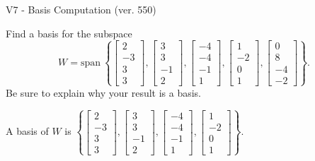 \begin{exercise}
  \begin{exerciseTitle}V7 - Basis Computation (ver. 550)\end{exerciseTitle}
  \begin{exerciseStatement}
    Find a basis for the subspace 
\[W=\mathrm{span}\ \left\{\left[\begin{array}{r}
2 \\
-3 \\
3 \\
3
\end{array}\right] , \left[\begin{array}{r}
3 \\
3 \\
-1 \\
2
\end{array}\right] , \left[\begin{array}{r}
-4 \\
-4 \\
-1 \\
1
\end{array}\right] , \left[\begin{array}{r}
1 \\
-2 \\
0 \\
1
\end{array}\right] , \left[\begin{array}{r}
0 \\
8 \\
-4 \\
-2
\end{array}\right]\right\}.\]
 Be sure to explain why your result is a basis.


  \end{exerciseStatement}
  \begin{exerciseAnswer}
   A basis of \(W\) is  \(\left\{\left[\begin{array}{r}
2 \\
-3 \\
3 \\
3
\end{array}\right] , \left[\begin{array}{r}
3 \\
3 \\
-1 \\
2
\end{array}\right] , \left[\begin{array}{r}
-4 \\
-4 \\
-1 \\
1
\end{array}\right] , \left[\begin{array}{r}
1 \\
-2 \\
0 \\
1
\end{array}\right]\right\}\).
  


  \end{exerciseAnswer}
\end{exercise}